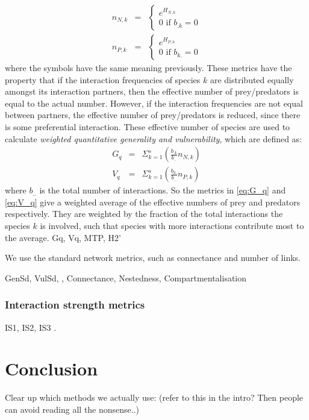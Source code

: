 \begin{eqnarray}
n_{N,k} &=& \begin{cases} e^{H_{N,k}}  \\ 0 \mbox{     if } b_{.k}=0 \end{cases} \label{eq:effective_prey} \\
n_{P,k} &=& \begin{cases} e^{H_{P,k}}  \\ 0 \mbox{     if } b_{k.}=0 \end{cases} \label{eq:effective_pred}
\end{eqnarray}
%
where the symbols have the same meaning previously. These metrics have the property that if the interaction frequencies of species $k$ are distributed equally amongst its interaction partners, then the effective number of prey/predators is equal to the actual number. However, if the interaction frequencies are not equal between partners, the effective number of prey/predators is reduced, since there is some preferential interaction. These effective number of species are used to calculate \emph{weighted quantitative generality and vulnerability}, which are defined as:  
\begin{eqnarray}
G_q &=& \Sigma_{k=1}^{s} \left( \frac{b_{.k}}{b_{..}} n_{N,k} \right) \label{eq:G_q} \\
V_q &=& \Sigma_{k=1}^{s} \left( \frac{b_{k.}}{b_{..}} n_{P,k} \right) \label{eq:V_q}
\end{eqnarray}
%
where $b_{..}$ is the total number of interactions. So the metrics in \eqref{eq:G_q} and \eqref{eq:V_q} give a weighted average of the effective numbers of prey and predators respectively. They are weighted by the fraction of the total interactions the species $k$ is involved, such that species with more interactions contribute most to the average.
Gq, Vq, MTP, H2'

We use the standard network metrics, such as connectance and number of links. 

GenSd, VulSd, , Connectance, Nestedness, Compartmentalisation


\subsubsection{Interaction strength metrics}

IS1, IS2, IS3 \cite{berlow2004interaction}.

\section{Conclusion}
\label{sec:methods_conclusion}

Clear up which methods we actually use: (refer to this in the intro? Then people can avoid reading all the nonsense..)